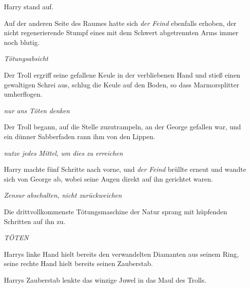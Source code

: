 Harry stand auf.

Auf der anderen Seite des Raumes hatte sich \emph{der Feind} ebenfalls erhoben, der nicht regenerierende Stumpf eines mit dem Schwert abgetrennten Arms immer noch blutig.

\emph{Tötungsabsicht}

Der Troll ergriff seine gefallene Keule in der verbliebenen Hand und stieß einen gewaltigen Schrei aus, schlug die Keule auf den Boden, so dass Marmorsplitter umherflogen.

\emph{nur ans Töten denken}

Der Troll begann, auf die Stelle zuzutrampeln, an der George gefallen war, und ein dünner Sabberfaden rann ihm von den Lippen.

\emph{nutze jedes Mittel, um dies zu erreichen}

Harry machte fünf Schritte nach vorne, und \emph{der Feind} brüllte erneut und wandte sich von George ab, wobei seine Augen direkt auf ihn gerichtet waren.

\emph{Zensur abschalten, nicht zurückweichen}

Die drittvollkommenste Tötungsmaschine der Natur sprang mit hüpfenden Schritten auf ihn zu.

\emph{TÖTEN}

Harrys linke Hand hielt bereits den verwandelten Diamanten aus seinem Ring, seine rechte Hand hielt bereits seinen Zauberstab.


Harrys Zauberstab lenkte das winzige Juwel in das Maul des Trolls.

